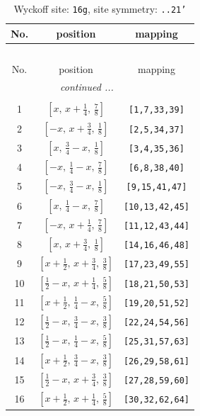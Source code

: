 \documentclass[fleqn,8pt]{jsarticle}
\begin{document}
\renewcommand{\arraystretch}{1.2}
\begin{longtable}{ccc}
\caption{Wyckoff site: {\tt 16g}, site symmetry: {\tt ..21'}}
 \\
 \hline \hline
No. & position & mapping \\ \hline \endfirsthead

\multicolumn{2}{l}{\tablename\ \thetable{}} \\
 \hline \hline
No. & position & mapping \\ \hline \endhead

 \hline \hline
\multicolumn{2}{r}{\footnotesize\it continued ...} \\ \endfoot

 \hline \hline
\multicolumn{2}{r}{} \\ \endlastfoot

1 & $\left[ x,\, x + \frac{1}{4},\, \frac{7}{8} \right]$ & {\tt [1,7,33,39]} \\ \hline
2 & $\left[ - x,\, x + \frac{3}{4},\, \frac{1}{8} \right]$ & {\tt [2,5,34,37]} \\ \hline
3 & $\left[ x,\, \frac{3}{4} - x,\, \frac{1}{8} \right]$ & {\tt [3,4,35,36]} \\ \hline
4 & $\left[ - x,\, \frac{1}{4} - x,\, \frac{7}{8} \right]$ & {\tt [6,8,38,40]} \\ \hline
5 & $\left[ - x,\, \frac{3}{4} - x,\, \frac{1}{8} \right]$ & {\tt [9,15,41,47]} \\ \hline
6 & $\left[ x,\, \frac{1}{4} - x,\, \frac{7}{8} \right]$ & {\tt [10,13,42,45]} \\ \hline
7 & $\left[ - x,\, x + \frac{1}{4},\, \frac{7}{8} \right]$ & {\tt [11,12,43,44]} \\ \hline
8 & $\left[ x,\, x + \frac{3}{4},\, \frac{1}{8} \right]$ & {\tt [14,16,46,48]} \\ \hline
9 & $\left[ x + \frac{1}{2},\, x + \frac{3}{4},\, \frac{3}{8} \right]$ & {\tt [17,23,49,55]} \\ \hline
10 & $\left[ \frac{1}{2} - x,\, x + \frac{1}{4},\, \frac{5}{8} \right]$ & {\tt [18,21,50,53]} \\ \hline
11 & $\left[ x + \frac{1}{2},\, \frac{1}{4} - x,\, \frac{5}{8} \right]$ & {\tt [19,20,51,52]} \\ \hline
12 & $\left[ \frac{1}{2} - x,\, \frac{3}{4} - x,\, \frac{3}{8} \right]$ & {\tt [22,24,54,56]} \\ \hline
13 & $\left[ \frac{1}{2} - x,\, \frac{1}{4} - x,\, \frac{5}{8} \right]$ & {\tt [25,31,57,63]} \\ \hline
14 & $\left[ x + \frac{1}{2},\, \frac{3}{4} - x,\, \frac{3}{8} \right]$ & {\tt [26,29,58,61]} \\ \hline
15 & $\left[ \frac{1}{2} - x,\, x + \frac{3}{4},\, \frac{3}{8} \right]$ & {\tt [27,28,59,60]} \\ \hline
16 & $\left[ x + \frac{1}{2},\, x + \frac{1}{4},\, \frac{5}{8} \right]$ & {\tt [30,32,62,64]} \\
\end{longtable}
\end{document}
